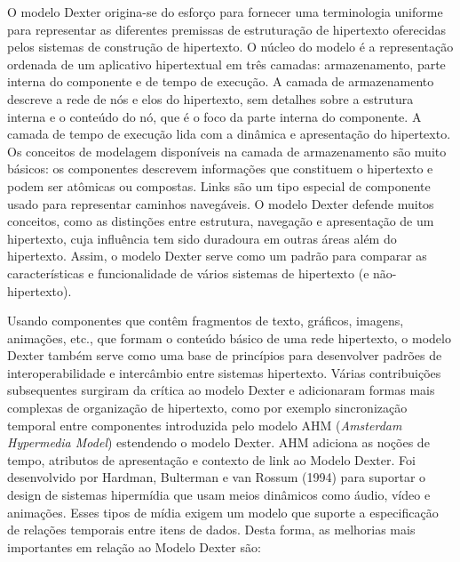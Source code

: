 O modelo Dexter \cite{Halasz:1994:DHR:175235.175237} origina-se do esforço para fornecer uma terminologia uniforme para representar as diferentes premissas de estruturação de hipertexto oferecidas pelos sistemas de construção de hipertexto. O núcleo do modelo é a representação ordenada de um aplicativo hipertextual em três camadas: armazenamento, parte interna do componente e de tempo de execução. A camada de armazenamento descreve a rede de nós e elos do hipertexto, sem detalhes sobre a estrutura interna e o conteúdo do nó, que é o foco da parte interna do componente. A camada de tempo de execução lida com a dinâmica e apresentação do hipertexto. Os conceitos de modelagem disponíveis na camada de armazenamento são muito básicos: os componentes descrevem informações que constituem o hipertexto e podem ser atômicas ou compostas. Links são um tipo especial de componente usado para representar caminhos navegáveis. O modelo Dexter defende muitos conceitos, como as distinções entre estrutura, navegação e apresentação de um hipertexto, cuja influência tem sido duradoura em outras áreas além do hipertexto. Assim, o modelo Dexter serve como um padrão para comparar as características e funcionalidade de vários sistemas de hipertexto (e não-hipertexto). 

Usando componentes que contêm fragmentos de texto, gráficos, imagens, animações, etc., que formam o conteúdo básico de uma rede hipertexto, o modelo Dexter também serve como uma base de princípios para desenvolver padrões de interoperabilidade e intercâmbio entre sistemas hipertexto. Várias contribuições subsequentes surgiram da crítica ao modelo Dexter e adicionaram formas mais complexas de organização de hipertexto, como por exemplo sincronização temporal entre componentes introduzida pelo modelo AHM (\emph{Amsterdam Hypermedia Model}) \cite{Hardman:1994:AHM:175235.175239} estendendo o modelo Dexter. AHM adiciona as noções de tempo, atributos de apresentação e contexto de link ao Modelo Dexter. Foi desenvolvido por Hardman, Bulterman e van Rossum (1994) para suportar o design de sistemas hipermídia que usam meios dinâmicos como áudio, vídeo e animações. Esses tipos de mídia exigem um modelo que suporte a especificação de relações temporais entre itens de dados. Desta forma, as melhorias mais importantes em relação ao Modelo Dexter são:

